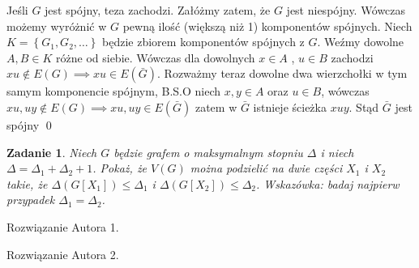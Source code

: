 \documentclass{mwart}
\newtheorem{zad}{Zadanie}[section]
\begin{document}
\begin{mdframed}
    Jeśli $G$ jest spójny, teza zachodzi. Załóżmy zatem, że $G$ jest niespójny. Wówczas możemy wyróżnić w $G$ pewną ilość (większą niż 1) komponentów spójnych.
    Niech \(K = \left\{G_{1},G_{2},\dots\right\}\) będzie zbiorem komponentów spójnych z $G$. Weźmy dowolne \(A,B \in K\) różne od siebie. Wówczas dla dowolnych \(x \in A\) , \(u \in B\) zachodzi 
    \(xu \notin E(G) \implies xu \in E(\bar{G})\). Rozważmy teraz dowolne dwa wierzchołki w tym samym komponencie spójnym, B.S.O niech \(x,y \in A\) oraz \(u \in B\), wówczas \(xu,uy \notin E(G) \implies xu,uy \in E(\bar{G})\) zatem w $\bar{G}$ istnieje ścieżka $xuy$.
    Stąd $\bar{G}$ jest spójny
    \qed
\end{mdframed}


\begin{zad}
    Niech $G$ będzie grafem o maksymalnym stopniu $\Delta$ i niech $\Delta = \Delta_1 + \Delta_2 +1$.
    Pokaż, że $V(G)$ można podzielić na dwie części $X_1$ i $X_2$ takie, że $\Delta (G[X_1]) \leq \Delta_1$ i $\Delta (G[X_2]) \leq \Delta_2$.
    Wskazówka: badaj najpierw przypadek $\Delta_1 = \Delta_2$.
\end{zad}
\begin{mdframed}
    Rozwiązanie Autora 1.
\end{mdframed}
\begin{mdframed}
    Rozwiązanie Autora 2.
\end{mdframed}
\end{document}
